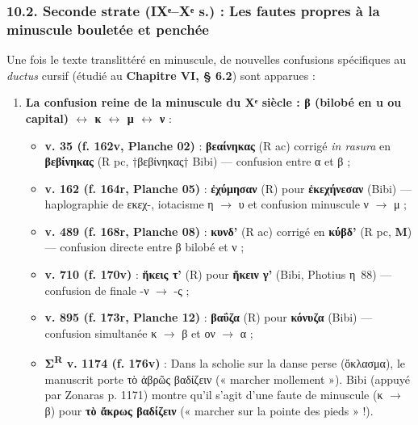 \documentclass[11pt, a4paper, twoside]{article}
\renewcommand{\_}{\origunderscore\penalty0\relax}
\renewcommand{\texttt}[1]{#1}
\newcommand{\R}{\textbf{R}}
\newcommand{\Rac}{\textbf{R}\textsuperscript{ac}}
\newcommand{\Rpc}{\textbf{R}\textsuperscript{pc}}
\newcommand{\M}{\textbf{M}}
\newcommand{\Bibi}{\textit{Bibi}}
\def\R{R}%
\def\Rac{R ac}%
\def\Rpc{R pc}%
\def\Bibi{Bibi}%
\begin{document}
\subsubsection{10.2. Seconde strate (IXᵉ–Xᵉ s.) : Les fautes propres à la minuscule bouletée et penchée}

Une fois le texte translittéré en minuscule, de nouvelles confusions spécifiques au \textit{ductus} cursif (étudié au \textbf{Chapitre VI, § 6.2}) sont apparues :

\begin{enumerate}[leftmargin=1.6em, itemsep=2pt]
  \item \textbf{La confusion reine de la minuscule du Xᵉ siècle : β (bilobé en \texttt{u} ou capital) $\leftrightarrow$ κ $\leftrightarrow$ μ $\leftrightarrow$ ν} :
  \begin{itemize}[leftmargin=1.5em, itemsep=2pt]
    \item \textbf{v. 35 (\texttt{f. 162v}, Planche 02)} : \textbf{\texttt{βεαίνηκας}} (\Rac{}) corrigé \textit{in rasura} en \textbf{\texttt{βεβίνηκας}} (\Rpc{}, \texttt{†βεβίνηκας†} \Bibi{}) — confusion entre α et β ;
    \item \textbf{v. 162 (\texttt{f. 164r}, Planche 05)} : \textbf{\texttt{ἐχύμησαν}} (\R{}) pour \textbf{\texttt{ἐκεχήνεσαν}} (\Bibi{}) — haplographie de εκεχ-, iotacisme η $\to$ υ et confusion minuscule ν $\to$ μ ;
    \item \textbf{v. 489 (\texttt{f. 168r}, Planche 08)} : \textbf{\texttt{κυνδ'}} (\Rac{}) corrigé en \textbf{\texttt{κύβδ'}} (\Rpc{}, \M{}) — confusion directe entre β bilobé et ν ;
    \item \textbf{v. 710 (\texttt{f. 170v})} : \textbf{\texttt{ἥκεις τ'}} (\R{}) pour \textbf{\texttt{ἥκειν γ'}} (\Bibi{}, Photius η~88) — confusion de finale -ν $\to$ -ς ;
    \item \textbf{v. 895 (\texttt{f. 173r}, Planche 12)} : \textbf{\texttt{βαΰζα}} (\R{}) pour \textbf{\texttt{κόνυζα}} (\Bibi{}) — confusion simultanée κ $\to$ β et ον $\to$ α ;
    \item \textbf{Σ\textsuperscript{R} v. 1174 (\texttt{f. 176v})} : Dans la scholie sur la danse perse (\texttt{ὄκλασμα}), le manuscrit porte \texttt{τὸ ἁβρῶς βαδίζειν} (« marcher mollement »). \Bibi{} (appuyé par Zonaras p. 1171) montre qu'il s'agit d'une faute de minuscule (κ $\to$ β) pour \textbf{\texttt{τὸ ἄκρως βαδίζειν}} (« marcher sur la pointe des pieds » !).
  \end{itemize}


\end{enumerate}
\end{document}
